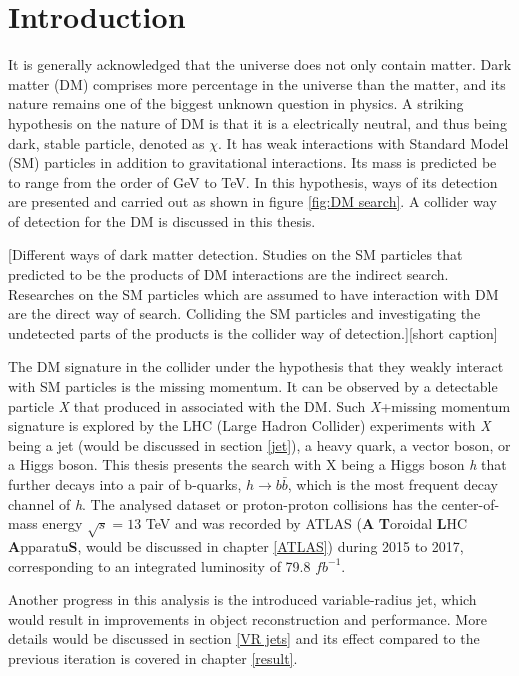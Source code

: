 \documentclass[class=NCU_thesis, crop=false]{standalone}
\begin{document}
\chapter{Introduction}
	It is generally acknowledged that the universe does not only contain matter. Dark matter (DM) comprises more percentage in the universe than the matter, and its nature remains one of the biggest unknown question in physics. A striking hypothesis on the nature of DM is that it is a electrically neutral, and thus being dark, stable particle, denoted as $\chi$. It has weak interactions with Standard Model (SM) particles in addition to gravitational interactions. Its mass is predicted be to range from the order of GeV to TeV. In this hypothesis, ways of its detection are presented and carried out as shown in figure \ref{fig:DM search}. A collider way of detection for the DM is discussed in this thesis.

	[Different ways of dark matter detection. Studies on the SM particles that predicted to be the products of DM interactions are the indirect search. Researches on the SM particles which are assumed to have interaction with DM are the direct way of search. Colliding the SM particles and investigating the undetected parts of the products is the collider way of detection.][short caption]

	\newpage

	The DM signature in the collider under the hypothesis that they weakly interact with SM particles is the missing momentum. It can be observed by a detectable particle \textit{X} that produced in associated with the DM. Such \textit{X}+missing momentum signature is explored by the LHC (Large Hadron Collider) experiments with \textit{X} being a jet (would be discussed in section \ref{jet}), a heavy quark, a vector boson, or a Higgs boson. This thesis presents the search with X being a Higgs boson \textit{h} that further decays into a pair of b-quarks, $h \rightarrow b\bar{b}$, which is the most frequent decay channel of \textit{h}. The analysed dataset or proton-proton collisions has the center-of-mass energy $\sqrt{s} = 13$ TeV and was recorded by ATLAS (\textbf{A} \textbf{T}oroidal \textbf{L}HC \textbf{A}pparatu\textbf{S}, would be discussed in chapter \ref{ATLAS}) during 2015 to 2017, corresponding to an integrated luminosity of 79.8 $fb^{-1}$.

	Another progress in this analysis is the introduced variable-radius jet, which would result in improvements in object reconstruction and performance. More details would be discussed in section \ref{VR jets} and its effect compared to the previous iteration is covered in chapter \ref{result}.
	
\end{document}
